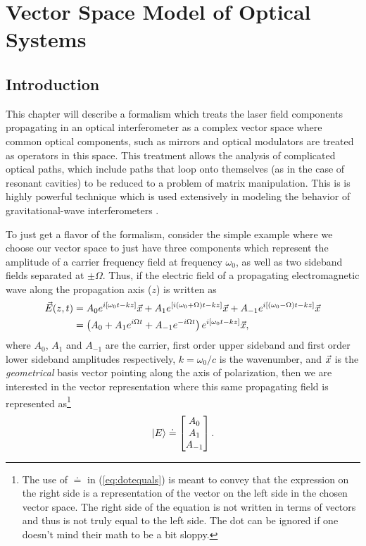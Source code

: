 

\chapter{Vector Space Model of Optical Systems}

\section{Introduction}
This chapter will describe a formalism which treats the laser field components propagating in an optical interferometer as a complex vector space where common optical components, such as mirrors and optical modulators are treated as operators in this space. %
This treatment allows the analysis of complicated optical paths, which include paths that loop onto themselves (as in the case of resonant cavities) to be reduced to a problem of matrix manipulation. %
This is is highly powerful technique which is used extensively in modeling the behavior of gravitational-wave interferometers \cite{Vinet1986,Hefetz:97,Sigg:00}.

To just get a flavor of the formalism, consider the simple example where we choose our vector space to just have three components which represent the amplitude of a carrier frequency field at frequency $\omega_0$, as well as two sideband fields separated at $\pm\Omega$. %
Thus, if the electric field of a propagating electromagnetic wave along the propagation axis ($z$) is written as
\begin{align*}
\vec{E}(z,t) &= A_0 e^{i[\omega_0t -kz]}\vec{x} + A_1e^{[i(\omega_0+\Omega)t -kz]}\vec{x} + A_{-1}e^{i[(\omega_0-\Omega)t -kz]}\vec{x}\\
&= \left( A_0 + A_1 e^{i\Omega t}+A_{-1}e^{-i\Omega t}\right) e^{i[\omega_0 t-kz]}\vec{x},
\end{align*}
where $A_0$, $A_1$ and $A_{-1}$ are the carrier, first order upper sideband and first order lower sideband amplitudes respectively, $k=\omega_0/c$ is the wavenumber, and $\vec{x}$ is the \emph{geometrical} basis vector pointing along the axis of polarization, then we are interested in the vector representation where this same propagating field is represented as\footnote{The use of $\doteq$ in (\ref{eq:dotequals}) is meant to convey that the expression on the right side is a representation of the vector on the left side in the chosen vector space. %
The right side of the equation is not written in terms of vectors and thus is not truly equal to the left side. %
The dot can be ignored if one doesn't mind their math to be a bit sloppy.} 
\begin{equation}
\label{eq:dotequals}
\left| E \right> \doteq \left[\begin{matrix} A_0 \\ A_1 \\ A_{-1} \end{matrix}\right].
\end{equation}

